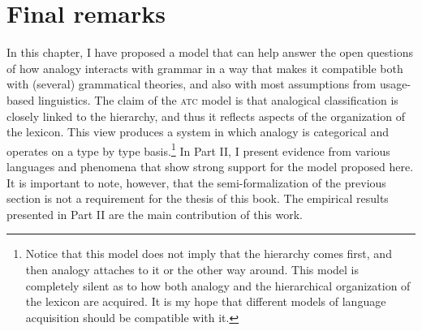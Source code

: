 
\section{Final remarks}

In this chapter, I have proposed a model that can help answer the open questions of how analogy interacts with grammar in a way that makes it compatible both with (several) grammatical theories, and also with most assumptions from usage-based linguistics.
The claim of the \textsc{atc} model is that analogical classification is closely linked to the hierarchy, and thus it reflects aspects of the organization of the lexicon. This view produces a system in which analogy is categorical and operates on a type by type basis.\footnote{Notice that this model does not imply that the hierarchy comes first, and then analogy attaches to it or the other way around. This model is completely silent as to how both analogy and the hierarchical organization of the lexicon are acquired. It is my hope that different models of language acquisition should be compatible with it.}
In Part II, I present evidence from various languages and phenomena that show strong support for the model proposed here.
It is important to note, however, that the semi-formalization of the previous section is not a requirement for the thesis of this book. The empirical results presented in Part II are the main contribution of this work. 

